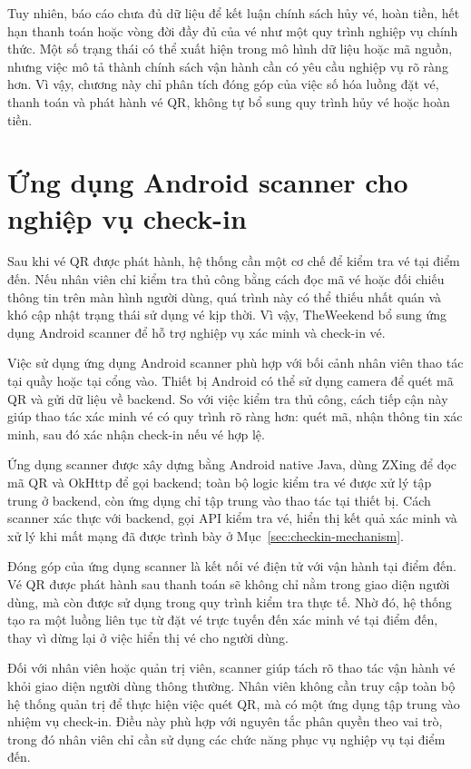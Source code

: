 \documentclass[../DoAn.tex]{subfiles}
\begin{document}
Tuy nhiên, báo cáo chưa đủ dữ liệu để kết luận chính sách hủy vé, hoàn tiền, hết hạn thanh toán hoặc vòng đời đầy đủ của vé như một quy trình nghiệp vụ chính thức. Một số trạng thái có thể xuất hiện trong mô hình dữ liệu hoặc mã nguồn, nhưng việc mô tả thành chính sách vận hành cần có yêu cầu nghiệp vụ rõ ràng hơn. Vì vậy, chương này chỉ phân tích đóng góp của việc số hóa luồng đặt vé, thanh toán và phát hành vé QR, không tự bổ sung quy trình hủy vé hoặc hoàn tiền.

\section{Ứng dụng Android scanner cho nghiệp vụ check-in}

Sau khi vé QR được phát hành, hệ thống cần một cơ chế để kiểm tra vé tại điểm đến. Nếu nhân viên chỉ kiểm tra thủ công bằng cách đọc mã vé hoặc đối chiếu thông tin trên màn hình người dùng, quá trình này có thể thiếu nhất quán và khó cập nhật trạng thái sử dụng vé kịp thời. Vì vậy, TheWeekend bổ sung ứng dụng Android scanner để hỗ trợ nghiệp vụ xác minh và check-in vé.

Việc sử dụng ứng dụng Android scanner phù hợp với bối cảnh nhân viên thao tác tại quầy hoặc tại cổng vào. Thiết bị Android có thể sử dụng camera để quét mã QR và gửi dữ liệu về backend. So với việc kiểm tra thủ công, cách tiếp cận này giúp thao tác xác minh vé có quy trình rõ ràng hơn: quét mã, nhận thông tin xác minh, sau đó xác nhận check-in nếu vé hợp lệ.

Ứng dụng scanner được xây dựng bằng Android native Java, dùng ZXing để đọc mã QR và OkHttp để gọi backend; toàn bộ logic kiểm tra vé được xử lý tập trung ở backend, còn ứng dụng chỉ tập trung vào thao tác tại thiết bị. Cách scanner xác thực với backend, gọi API kiểm tra vé, hiển thị kết quả xác minh và xử lý khi mất mạng đã được trình bày ở Mục~\ref{sec:checkin-mechanism}.

Đóng góp của ứng dụng scanner là kết nối vé điện tử với vận hành tại điểm đến. Vé QR được phát hành sau thanh toán sẽ không chỉ nằm trong giao diện người dùng, mà còn được sử dụng trong quy trình kiểm tra thực tế. Nhờ đó, hệ thống tạo ra một luồng liên tục từ đặt vé trực tuyến đến xác minh vé tại điểm đến, thay vì dừng lại ở việc hiển thị vé cho người dùng.

Đối với nhân viên hoặc quản trị viên, scanner giúp tách rõ thao tác vận hành vé khỏi giao diện người dùng thông thường. Nhân viên không cần truy cập toàn bộ hệ thống quản trị để thực hiện việc quét QR, mà có một ứng dụng tập trung vào nhiệm vụ check-in. Điều này phù hợp với nguyên tắc phân quyền theo vai trò, trong đó nhân viên chỉ cần sử dụng các chức năng phục vụ nghiệp vụ tại điểm đến.
\end{document}
